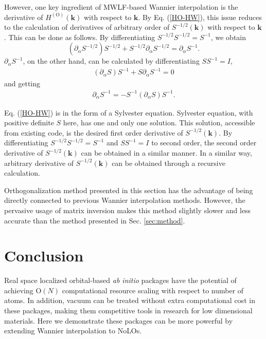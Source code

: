 However, one key ingredient of MWLF-based Wannier interpolation is the derivative of $H^{(\text{O})}(\boldsymbol{k})$ with respect to $\boldsymbol{k}$. By Eq. (\ref{HO-HW}), this issue reduces to the calculation of derivatives of arbitrary order of $S^{-1/2}(\boldsymbol{k})$ with respect to $\boldsymbol{k}$ . This can be done as follows. By differentiating $S^{-1/2}S^{-1/2}=S^{-1}$, we obtain
\begin{equation}
(\partial_{\alpha}S^{-1/2})S^{-1/2}+S^{-1/2}\partial_{\alpha}S^{-1/2}=\partial_{\alpha}S^{-1}.\label{dS1/2-1}
\end{equation}
$\partial_{\alpha}S^{-1}$, on the other hand, can be calculated by differentiating $SS^{-1}=I$,
\begin{align}
(\partial_{\alpha}S)S^{-1}+S\partial_{\alpha}S^{-1}=0
\end{align}
and getting
\begin{align}
\partial_{\alpha}S^{-1} = -S^{-1}(\partial_{\alpha}S)S^{-1}.
\end{align}

Eq. (\ref{HO-HW}) is in the form of a Sylvester equation\cite{sylvester}. Sylvester equation, with positive definite $S$ here, has one and only one solution. This solution, accessible from existing code\cite{laug}, is the desired first order derivative of $S^{-1/2}(\boldsymbol{k})$. By differentiating $S^{-1/2}S^{-1/2}=S^{-1}$ and $SS^{-1}=I$ to second order, the second order derivative of $S^{-1/2}(\boldsymbol{k})$ can be obtained in a similar manner. In a similar way, arbitrary derivative of $S^{-1/2}(\boldsymbol{k})$ can be obtained through a recursive calculation.

Orthogonalization method presented in this section has the advantage of being directly connected to previous Wannier interpolation methods. However, the pervasive usage of matrix inversion makes this method slightly slower and less accurate than the method presented in Sec. \ref{sec:method}. 

\section{Conclusion}

Real space localized orbital-based \emph{ab initio} packages have the potential of achieving $\text{O}(N)$ computational resource scaling with respect to number of atoms. In addition, vacuum can be treated without extra computational cost in these packages, making them competitive tools in research for low dimensional materials. Here we demonstrate these packages can be more powerful by extending Wannier interpolation to NoLOs. 

